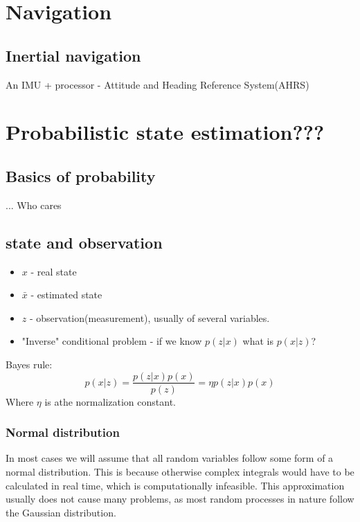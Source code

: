 
\chapter{Navigation}

\section{Inertial navigation}
An IMU + processor - Attitude and Heading Reference System(AHRS)
\chapter{Probabilistic state estimation???}

\section{Basics of probability}
... Who cares
\section{state and observation}
{
    \begin{itemize}
        \item $x$ - real state
        \item $\bar{x}$ - estimated state
        \item  $z$ - observation(measurement), usually of several variables.
        \item "Inverse" conditional problem - if we know $p(z|x)$ what is  $p(x|z)$?
        
    \end{itemize}
    Bayes rule:
    \begin{equation}
        \label{bayes}
        p(x|z) = \frac{p(z|x)p(x)}{p(z)} = \eta p(z|x)p(x)
    \end{equation}
    Where $\eta$ is athe normalization constant.
}

\subsection{Normal distribution}
In most cases we will assume that all random variables follow some form of a normal distribution. This is because otherwise complex integrals would have to be calculated in real time, which is computationally infeasible. This approximation usually does not cause many problems, as most random processes in nature follow the Gaussian distribution.


